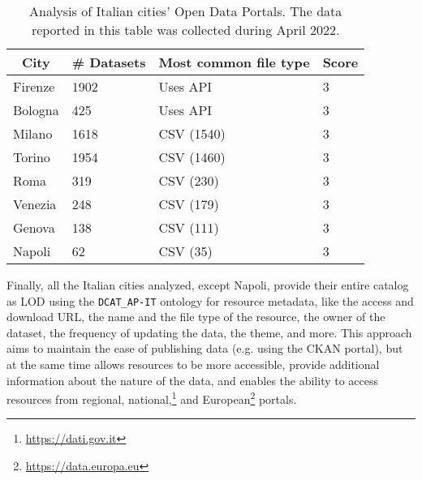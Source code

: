 \begin{table}[!ht]
  \onehalfspacing
  \centering
  \begin{tabular}{|l|l|l|l|}
    \hline
    \multicolumn{1}{|c|}{\textbf{City}} & \multicolumn{1}{c|}{\textbf{\# Datasets}} & \multicolumn{1}{c|}{\textbf{Most common file type}} & \multicolumn{1}{c|}{\textbf{Score}} \\ \hline
    Firenze                   & 1902                                             & Uses \acs{API}                                       & 3                                   \\ \hline
    Bologna                   & 425                                              & Uses \acs{API}                                       & 3                                   \\ \hline
    Milano                    & 1618                                             & CSV (1540)                                           & 3                                   \\ \hline
    Torino                    & 1954                                             & CSV (1460)                                           & 3                                   \\ \hline
    Roma                      & 319                                              & CSV (230)                                            & 3                                   \\ \hline
    Venezia                   & 248                                              & CSV (179)                                            & 3                                   \\ \hline
    Genova                    & 138                                              & CSV (111)                                            & 3                                   \\ \hline
    Napoli                    & 62                                               & CSV (35)                                             & 3                                   \\ \hline
  \end{tabular}
  \caption{Analysis of Italian cities' Open Data Portals. The data reported in this table was collected during April 2022.}
  \label{tab:italian-cities}
\end{table}

Finally, all the Italian cities analyzed, except Napoli, provide their entire catalog as \acl{LOD} using the \verb#DCAT_AP-IT# ontology for resource metadata, like the access and download \acs{URL}, the name and the file type of the resource, the owner of the dataset, the frequency of updating the data, the theme, and more. This approach aims to maintain the ease of publishing data (e.g. using the CKAN portal), but at the same time allows resources to be more accessible, provide additional information about the nature of the data, and enables the ability to access resources from regional, national,\footnote{\url{https://dati.gov.it}} and European\footnote{\url{https://data.europa.eu}} portals.
